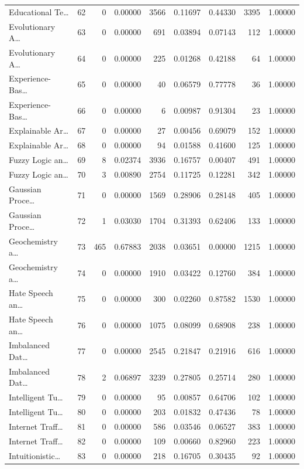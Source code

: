 \begin{table}
\begin{tabular}{lrrrrrrrr}
Educational Te… & 62 & 0 & 0.00000 & 3566 & 0.11697 & 0.44330 & 3395 & 1.00000 \\
Evolutionary A… & 63 & 0 & 0.00000 & 691 & 0.03894 & 0.07143 & 112 & 1.00000 \\
Evolutionary A… & 64 & 0 & 0.00000 & 225 & 0.01268 & 0.42188 & 64 & 1.00000 \\
Experience-Bas… & 65 & 0 & 0.00000 & 40 & 0.06579 & 0.77778 & 36 & 1.00000 \\
Experience-Bas… & 66 & 0 & 0.00000 & 6 & 0.00987 & 0.91304 & 23 & 1.00000 \\
Explainable Ar… & 67 & 0 & 0.00000 & 27 & 0.00456 & 0.69079 & 152 & 1.00000 \\
Explainable Ar… & 68 & 0 & 0.00000 & 94 & 0.01588 & 0.41600 & 125 & 1.00000 \\
Fuzzy Logic an… & 69 & 8 & 0.02374 & 3936 & 0.16757 & 0.00407 & 491 & 1.00000 \\
Fuzzy Logic an… & 70 & 3 & 0.00890 & 2754 & 0.11725 & 0.12281 & 342 & 1.00000 \\
Gaussian Proce… & 71 & 0 & 0.00000 & 1569 & 0.28906 & 0.28148 & 405 & 1.00000 \\
Gaussian Proce… & 72 & 1 & 0.03030 & 1704 & 0.31393 & 0.62406 & 133 & 1.00000 \\
Geochemistry a… & 73 & 465 & 0.67883 & 2038 & 0.03651 & 0.00000 & 1215 & 1.00000 \\
Geochemistry a… & 74 & 0 & 0.00000 & 1910 & 0.03422 & 0.12760 & 384 & 1.00000 \\
Hate Speech an… & 75 & 0 & 0.00000 & 300 & 0.02260 & 0.87582 & 1530 & 1.00000 \\
Hate Speech an… & 76 & 0 & 0.00000 & 1075 & 0.08099 & 0.68908 & 238 & 1.00000 \\
Imbalanced Dat… & 77 & 0 & 0.00000 & 2545 & 0.21847 & 0.21916 & 616 & 1.00000 \\
Imbalanced Dat… & 78 & 2 & 0.06897 & 3239 & 0.27805 & 0.25714 & 280 & 1.00000 \\
Intelligent Tu… & 79 & 0 & 0.00000 & 95 & 0.00857 & 0.64706 & 102 & 1.00000 \\
Intelligent Tu… & 80 & 0 & 0.00000 & 203 & 0.01832 & 0.47436 & 78 & 1.00000 \\
Internet Traff… & 81 & 0 & 0.00000 & 586 & 0.03546 & 0.06527 & 383 & 1.00000 \\
Internet Traff… & 82 & 0 & 0.00000 & 109 & 0.00660 & 0.82960 & 223 & 1.00000 \\
Intuitionistic… & 83 & 0 & 0.00000 & 218 & 0.16705 & 0.30435 & 92 & 1.00000 \\

\end{tabular}
\end{table}

